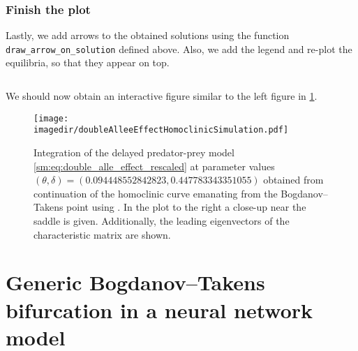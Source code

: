 \subsubsection{Finish the plot}
Lastly, we add arrows to the obtained solutions using the function
\texttt{draw_arrow_on_solution} defined above. Also, we add the
legend and re-plot the equilibria, so that they appear on top.
\inputminted[firstline=149, lastline=161]{julia}{\pathToJuliaFiles/predator_prey_simulation_article.jl}
We should now obtain an interactive figure similar to the left figure in \cref{sm:fig:doubleAlleeEffectHomoclinicSimulation}.
%
\begin{figure}[!ht]
    \centering
    \texttt{[image: \\imagedir/doubleAlleeEffectHomoclinicSimulation.pdf]}
    \caption{Integration of the delayed predator-prey model
        \cref{sm:eq:double_alle_effect_rescaled} at parameter values $(\theta,
        \delta) = (0.094448552842823, 0.447783343351055)$ obtained from
        continuation of the homoclinic curve emanating from the
        Bogdanov--Takens point using \DDEBIFTOOL. In the plot to the right
        a close-up near the saddle is given. Additionally, the 
        leading eigenvectors of the characteristic matrix
        are shown.}
    \label{sm:fig:doubleAlleeEffectHomoclinicSimulation}
\end{figure}


\section[Bogdanov--Takens bifurcation in a neural network model]
        {Generic Bogdanov--Takens bifurcation in a neural network model}

